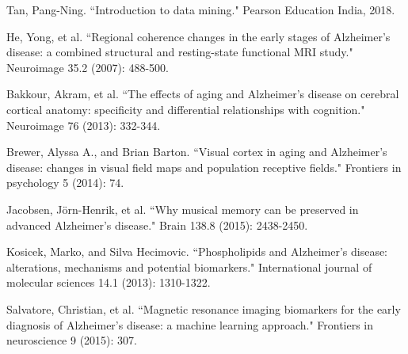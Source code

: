 \begin{thebibliography}{1}
		
		Tan, Pang-Ning. ``Introduction to data mining." Pearson Education India, 2018.
		
		
		
		
		
		
		
		
		
		He, Yong, et al. ``Regional coherence changes in the early stages of Alzheimer’s disease: a combined structural and resting-state functional MRI study." Neuroimage 35.2 (2007): 488-500.
		
		
		
		Bakkour, Akram, et al. ``The effects of aging and Alzheimer's disease on cerebral cortical anatomy: specificity and differential relationships with cognition." Neuroimage 76 (2013): 332-344.
		
		Brewer, Alyssa A., and Brian Barton. ``Visual cortex in aging and Alzheimer's disease: changes in visual field maps and population receptive fields." Frontiers in psychology 5 (2014): 74.
		
		Jacobsen, Jörn-Henrik, et al. ``Why musical memory can be preserved in advanced Alzheimer’s disease." Brain 138.8 (2015): 2438-2450.
		
		Kosicek, Marko, and Silva Hecimovic. ``Phospholipids and Alzheimer’s disease: alterations, mechanisms and potential biomarkers." International journal of molecular sciences 14.1 (2013): 1310-1322.
		
		Salvatore, Christian, et al. ``Magnetic resonance imaging biomarkers for the early diagnosis of Alzheimer's disease: a machine learning approach." Frontiers in neuroscience 9 (2015): 307.
		

\end{thebibliography}
